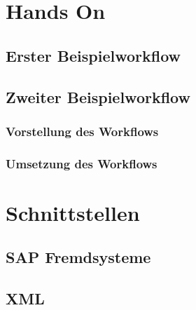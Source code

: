 \section{Hands On}

\subsection{Erster Beispielworkflow}
\label{sec:builder-1-bsp}

\subsection{Zweiter Beispielworkflow}
\label{sec:builder-2-bsp}
%

\subsubsection{Vorstellung des Workflows}
\label{sec:builder-2-bsp-vorstellung}

\subsubsection{Umsetzung des Workflows}
\label{sec:builder-2-bsp-umsetzung}

\section{Schnittstellen}

\subsection{SAP Fremdsysteme}
\label{sec:export-sap}


\subsection{XML}
\label{sec:export-xml}

